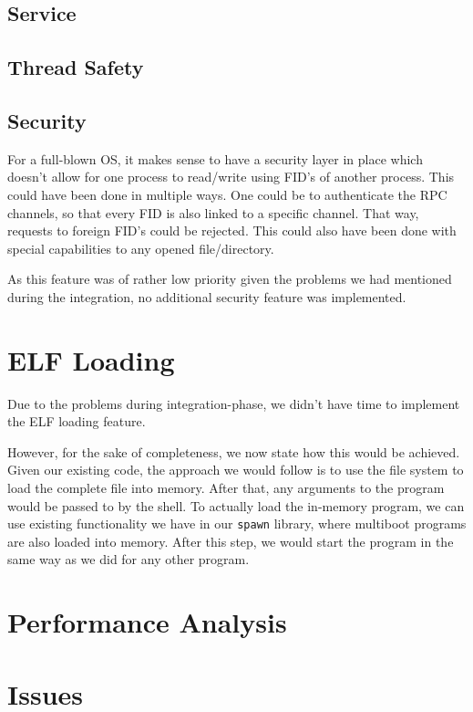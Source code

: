 \subsection{Service}

\subsection{Thread Safety}

\subsection{Security}
For a full-blown OS, it makes sense to have a security layer in place which 
doesn't allow for one process to read/write using FID's of another process.
This could have been done in multiple ways. One could be to authenticate the RPC channels,
so that every FID is also linked to a specific channel. That way, requests to foreign 
FID's could be rejected. This could also have been done with special capabilities to
any opened file/directory. 

As this feature was of rather low priority given the problems we had mentioned
during the integration, no additional security feature was implemented.

\section{ELF Loading}
Due to the problems during integration-phase, we didn't have time to implement
the ELF loading feature.

However, for the sake of completeness, we now state how this would be achieved.
Given our existing code, the approach we would follow is to use 
the file system to load the complete file into memory. After that,
any arguments to the program would be passed to by the shell.
To actually load the in-memory program, we can use existing functionality 
we have in our \texttt{spawn} library, where multiboot programs 
are also loaded into memory. After this step, we would start the program 
in the same way as we did for any other program.

\section{Performance Analysis}

\section{Issues}